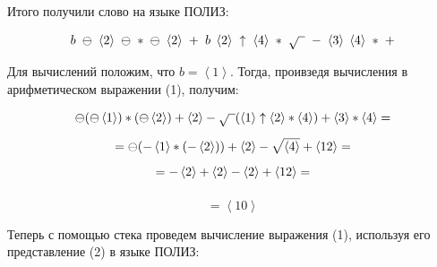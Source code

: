 \documentclass[a4paper, 14pt]{extarticle}
\begin{document}
Итого получили слово на языке ПОЛИЗ:

\begin{equation}
    b \hspace{3pt} \ominus \hspace{3pt} \left< 2 \right> \hspace{3pt} \ominus \hspace{3pt} * \hspace{3pt} \ominus \hspace{3pt} \left< 2 \right> \hspace{3pt} + \hspace{3pt} b \hspace{3pt} \left< 2 \right> \hspace{3pt} \uparrow \hspace{3pt} \left< 4 \right> \hspace{3pt} * \hspace{3pt} \sqrt{\hphantom{1}} \hspace{3pt} - \hspace{3pt} \left< 3 \right> \hspace{3pt} \left< 4 \right> \hspace{3pt} * \hspace{3pt} + 
\end{equation}

Для вычислений положим, что $b = \left< 1 \right>$. Тогда, проивзедя вычисления в 
арифметическом выражении (1), получим:

\begin{gather*}
    \ominus(\ominus \left< 1 \right>) * (\ominus \left< 2 \right>) + \left< 2 \right> - 
    \sqrt{\hphantom{1}} (\left< 1 \right> \uparrow \left< 2 \right> * \left< 4 \right>) + 
    \left< 3 \right> * \left< 4 \right> = \\[0.5em]
    = \ominus (- \left< 1 \right> * (- \left< 2 \right>)) + \left< 2 \right> - \sqrt{\left< 4 \right>} + 
    \left< 12 \right> = \\[0.5em]
    = - \left< 2 \right> + \left< 2 \right> - \left< 2 \right> + \left< 12 \right> =\\[0.5em]
\end{gather*}

\vspace{-50pt}

\begin{equation}
    = \left< 10 \right>
\end{equation}

Теперь с помощью стека проведем вычисление выражения (1), используя его представление (2) в языке 
ПОЛИЗ:
\end{document}
